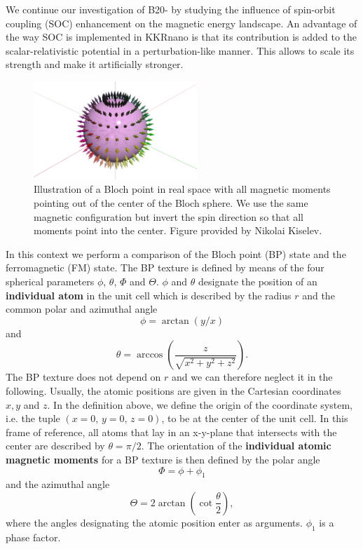 \documentclass[graybox]{svmult}
\newcommand{\beq}{\begin{equation}}
\newcommand{\eeq}{\end{equation}}
\begin{document}
We continue our investigation of B20- by studying the influence of spin-orbit
coupling (SOC) enhancement on the magnetic energy landscape.
An advantage of the way SOC is implemented in KKRnano is that
its contribution is added to the scalar-relativistic
potential in a perturbation-like manner. This allows to scale its strength and make it
artificially stronger.
\begin{figure}[htb]
	\sidecaption
	\includegraphics[width=0.55\textwidth]{Figures/blochpoint.png}
	\caption{Illustration of a Bloch point in real space with all magnetic moments
	pointing out of the center of the Bloch sphere.
	We use the same magnetic configuration but invert the spin direction so that all moments point
	into the center. Figure provided by Nikolai Kiselev.
	}
	\label{fig:mnge_blochpoint}
\end{figure}
In this context we perform a comparison of the Bloch point (BP) state 
and the ferromagnetic (FM) state.
The BP texture is defined by means of the four spherical parameters $\phi$, $\theta$, 
$\Phi$ and $\Theta$.
$\phi$ and $\theta$ designate the position of an \textbf{individual atom} in the unit cell
which is described by the radius $r$ and the common polar and azimuthal angle
\beq
\phi = \arctan{\left(y/x\right)}
\eeq
and
\beq
\theta = \arccos{\left( \frac{z}{\sqrt{x^2+y^2+z^2}} \right)}.
\eeq
The BP texture does not depend on $r$ and we can therefore neglect it in the following.
Usually, the atomic positions are given in the Cartesian coordinates $x,y$ and $z$.
In the definition above, we define the origin of the coordinate system, i.e. the tuple $(x=0, \, y=0, \, z=0)$,
to be at the center of the unit cell.
In this frame of reference, all atoms that lay in an x-y-plane that intersects with the center
are described by $\theta=\pi/2$.
The orientation of the \textbf{individual atomic magnetic moments} for a BP texture is then defined 
by the polar angle
\beq
\Phi = \phi + \phi_{1}
\eeq
and the azimuthal angle
\beq
\Theta = 2 \arctan{\left(\cot{\frac{\theta}{2}} \right)},
\eeq
where the angles designating the atomic position enter as arguments. $\phi_{1}$ is a phase factor.
\end{document}
